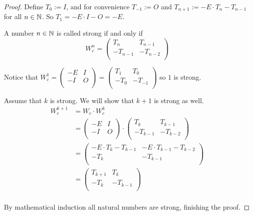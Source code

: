 \begin{proof}
  Define $T_{0} := I$, and for convenience $T_{-1} := O$ and
  $T_{n+1} := -E \cdot T_{n} - T_{n-1}$ for all $n\in\mathbb{N}$. So
  $T_{1} = -E \cdot I - O = -E$. 

  A number $n\in\mathbb{N}$ is called strong if and only if
  \[
  W_{c}^{n}
  =
  \left(
  \begin{array}{cc}
     T_{n} &  T_{n-1}  \\
    -T_{n-1} & -T_{n-2} \\
  \end{array}
  \right)
  \]

  Notice that
  $W_{c}^{1} = \left(\begin{smallmatrix} -E & I \\ -I & O \\\end{smallmatrix}\right) = \left(\begin{smallmatrix} T_{1} & T_{0} \\ -T_{0} & -T_{-1} \\\end{smallmatrix}\right)$
  so $1$ is strong.

  Assume that $k$ is strong. We will show that $k+1$ is strong as well.
  \[
  \begin{aligned}
  W_{c}^{k+1}
  & = W_{c} \cdot W_{c}^{k} \\
  & =
  \left(
  \begin{array}{cc}
    -E & I \\
    -I & O \\
  \end{array}
  \right)
  \cdot
  \left(
  \begin{array}{cc}
     T_{k} &  T_{k-1}  \\
    -T_{k-1} & -T_{k-2} \\
  \end{array}
  \right) \\
  & =
  \left(
  \begin{array}{cc}
    -E \cdot T_{k} - T_{k-1} & -E \cdot T_{k-1} - T_{k-2} \\
    -T_{k}                  & -T_{k-1}                  \\
  \end{array}
  \right) \\
  & =
  \left(
  \begin{array}{cc}
     T_{k+1} &  T_{k} \\
    -T_{k} & -T_{k-1} \\
  \end{array}
  \right) \\
  \end{aligned}
  \]

  By mathematical induction all natural numbers are strong, finishing the proof.
\end{proof}

